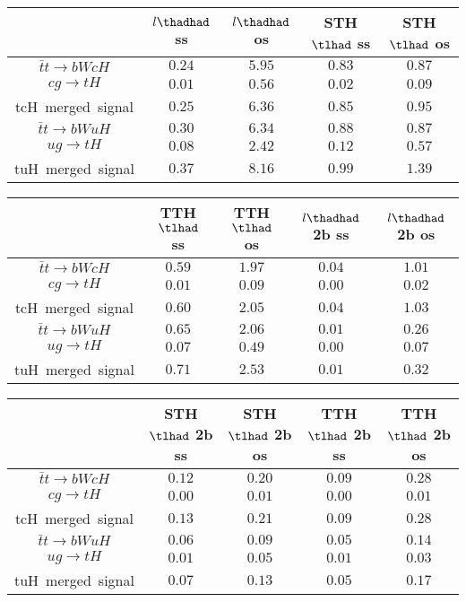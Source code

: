 \centering
\begin{tabular}{|c|c|c|c|c|} \hline
 & $l\thadhad$ ss & $l\thadhad$ os & STH $\tlhad$ ss & STH $\tlhad$ os\\\hline
$\bar{t}t\to bWcH$ & $0.24$ & $5.95$ & $0.83$ & $0.87$\\\hline
$cg\to tH$ & $0.01$ & $0.56$ & $0.02$ & $0.09$\\\hline
tcH~merged~signal & $0.25$ & $6.36$ & $0.85$ & $0.95$\\\hline
$\bar{t}t\to bWuH$ & $0.30$ & $6.34$ & $0.88$ & $0.87$\\\hline
$ug\to tH$ & $0.08$ & $2.42$ & $0.12$ & $0.57$\\\hline
tuH~merged~signal & $0.37$ & $8.16$ & $0.99$ & $1.39$\\\hline
\end{tabular}
\begin{tabular}{|c|c|c|c|c|} \hline
 & TTH $\tlhad$ ss & TTH $\tlhad$ os & $l\thadhad$ 2b ss & $l\thadhad$ 2b os\\\hline
$\bar{t}t\to bWcH$ & $0.59$ & $1.97$ & $0.04$ & $1.01$\\\hline
$cg\to tH$ & $0.01$ & $0.09$ & $0.00$ & $0.02$\\\hline
tcH~merged~signal & $0.60$ & $2.05$ & $0.04$ & $1.03$\\\hline
$\bar{t}t\to bWuH$ & $0.65$ & $2.06$ & $0.01$ & $0.26$\\\hline
$ug\to tH$ & $0.07$ & $0.49$ & $0.00$ & $0.07$\\\hline
tuH~merged~signal & $0.71$ & $2.53$ & $0.01$ & $0.32$\\\hline
\end{tabular}
\begin{tabular}{|c|c|c|c|c|} \hline
 & STH $\tlhad$ 2b ss & STH $\tlhad$ 2b os & TTH $\tlhad$ 2b ss & TTH $\tlhad$ 2b os\\\hline
$\bar{t}t\to bWcH$ & $0.12$ & $0.20$ & $0.09$ & $0.28$\\\hline
$cg\to tH$ & $0.00$ & $0.01$ & $0.00$ & $0.01$\\\hline
tcH~merged~signal & $0.13$ & $0.21$ & $0.09$ & $0.28$\\\hline
$\bar{t}t\to bWuH$ & $0.06$ & $0.09$ & $0.05$ & $0.14$\\\hline
$ug\to tH$ & $0.01$ & $0.05$ & $0.01$ & $0.03$\\\hline
tuH~merged~signal & $0.07$ & $0.13$ & $0.05$ & $0.17$\\\hline
\end{tabular}
